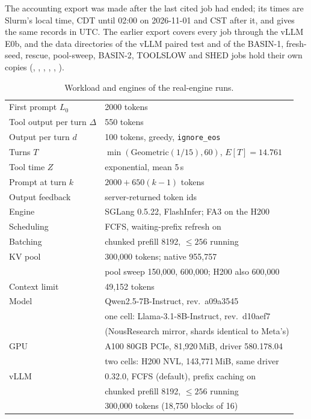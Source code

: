 \noindent The accounting export  was made after the last cited job had ended; its times are Slurm's local time, CDT until 02:00 on 2026-11-01 and CST after it, and  gives the same records in UTC. The earlier export  covers every job through the vLLM E0b, and the data directories of the vLLM paired test and of the BASIN-1, fresh-seed, rescue, pool-sweep, BASIN-2, TOOLSLOW and SHED jobs hold their own copies (, , , , , ).

\begin{table}[htbp]
\centering\footnotesize
\caption{Workload and engines of the real-engine runs.}\label{tab:workload}
\begin{tabular}{@{}l l@{}}
\toprule
First prompt $L_0$ & 2000 tokens\\
Tool output per turn $\Delta$ & 550 tokens\\
Output per turn $d$ & 100 tokens, greedy, \texttt{ignore\_eos}\\
Turns $T$ & $\min(\mathrm{Geometric}(1/15),60)$, $E[T]=14.761$\\
Tool time $Z$ & exponential, mean 5\,s\\
Prompt at turn $k$ & $2000+650(k-1)$ tokens\\
Output feedback & server-returned token ids\\
\midrule
Engine & SGLang 0.5.22, FlashInfer; FA3 on the H200\\
Scheduling & FCFS, waiting-prefix refresh on\\
Batching & chunked prefill 8192, $\le256$ running\\
KV pool & 300,000 tokens; native 955,757\\
 & pool sweep 150,000, 600,000; H200 also 600,000\\
Context limit & 49,152 tokens\\
Model & Qwen2.5-7B-Instruct, rev.\ a09a3545\\
 & one cell: Llama-3.1-8B-Instruct, rev.\ d10aef7\\
 & (NousResearch mirror, shards identical to Meta's)\\
GPU & A100 80GB PCIe, 81,920\,MiB, driver 580.178.04\\
 & two cells: H200 NVL, 143,771\,MiB, same driver\\
\midrule
vLLM & 0.32.0, FCFS (default), prefix caching on\\
 & chunked prefill 8192, $\le256$ running\\
 & 300,000 tokens (18,750 blocks of 16)\\
\bottomrule
\end{tabular}
\end{table}

